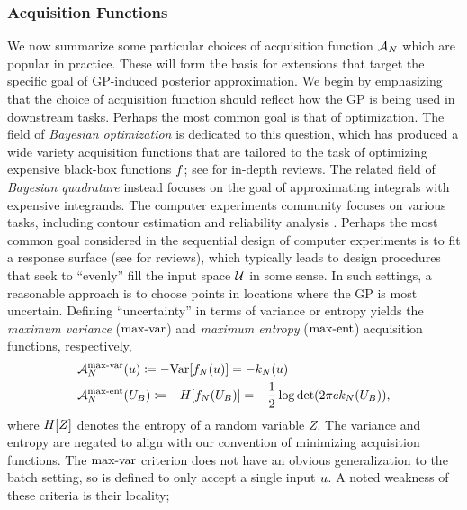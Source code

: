 \documentclass[12pt]{article}
\begin{document}
\subsubsection{Acquisition Functions}
We now summarize some particular choices of acquisition function $\acq[\Ndesign]$ which are popular in practice. These will form 
the basis for extensions that target the specific goal of GP-induced posterior approximation. We begin by emphasizing that the 
choice of acquisition function should reflect how the GP is being used in downstream tasks. Perhaps the most common goal is that 
of optimization. The field of \textit{Bayesian optimization} is dedicated to this question, which has produced a wide variety
acquisition functions that are tailored to the task of optimizing expensive black-box functions $\func$; 
see \cite{reviewBayesOpt, gramacy2020surrogates} for in-depth reviews.  
The related field of \textit{Bayesian quadrature} \cite{BayesQuadrature, BayesQuadrature, BayesQuadRatios}
instead focuses on the goal of approximating integrals with expensive integrands. The computer experiments community 
focuses on various tasks, including contour estimation and reliability analysis \cite{contourEstimation, cole2021entropybased}. 
Perhaps the most common goal considered in the sequential design of computer experiments is to fit a response surface
(see \cite{gramacy2020surrogates, SanterCompExp, design_analysis_computer_experiments} for reviews), 
which typically leads to design procedures 
that seek to ``evenly'' fill the input space $\parSpace$ in some sense.  
In such settings, a reasonable approach is to choose points in locations where the GP is most uncertain. 
Defining ``uncertainty'' in terms 
of variance or entropy yields the \textit{maximum variance} ($\maxvarLabel$) and \textit{maximum entropy}
($\maxentLabel$) acquisition functions, respectively, 
\begin{align}
&\labelAcq[\Ndesign]{\maxvarLabel}(\Par) \Def -\Var[\funcEm[\Ndesign](\Par)]  =  -\gpKer(\Par) \\ 
&\labelAcq[\Ndesign]{\maxentLabel}(\designBatchIn) \Def -\Ent[\funcEm[\Ndesign](\designBatchIn)] = -\frac{1}{2} \log\det(2\pi e \gpKer(\designBatchIn)), \label{acq_max_var_ent}
\end{align} 
where $\Ent[Z]$ denotes the entropy of a random variable $Z$. The variance and entropy are negated to align with our convention 
of minimizing acquisition functions. The $\maxvarLabel$ criterion does not have an obvious generalization to the batch setting, 
so is defined to only accept a single input $\Par$. A noted weakness of these criteria is their locality; 
\end{document}
